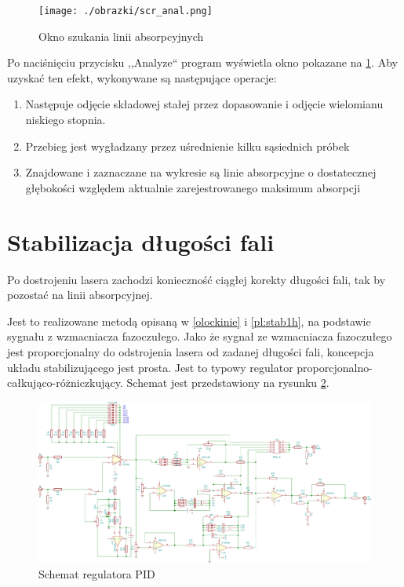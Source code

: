 \documentclass[a4paper,10pt,twoside]{report}
\begin{document}
\begin{figure}
\begin{center}
 \texttt{[image: ./obrazki/scr\_anal.png]}
\end{center}
\caption{Okno szukania linii absorpcyjnych}
\label{scr-anal}
\end{figure}

Po naciśnięciu przycisku ,,Analyze`` program wyświetla okno pokazane na \ref{scr-anal}.
Aby uzyskać ten efekt, wykonywane są następujące operacje:
\begin{enumerate}
 \item Następuje odjęcie składowej stałej przez dopasowanie i odjęcie wielomianu niskiego stopnia.
 \item Przebieg jest wygładzany przez uśrednienie kilku sąsiednich próbek
 \item Znajdowane i zaznaczane na wykresie są linie absorpcyjne o dostatecznej głębokości względem aktualnie zarejestrowanego maksimum absorpcji
\end{enumerate}





\section{Stabilizacja długości fali}

Po dostrojeniu lasera zachodzi konieczność ciągłej korekty długości fali, tak by pozostać na linii absorpcyjnej.

Jest to realizowane metodą opisaną w \ref{olockinie} i \ref{pl:stab1h}, na podstawie sygnału z wzmacniacza fazoczułego. %
Jako że sygnał ze wzmacniacza fazoczułego jest proporcjonalny do odstrojenia lasera od zadanej długości fali, koncepcja układu stabilizującego jest prosta.
Jest to typowy regulator proporcjonalno-całkująco-różniczkujący. Schemat jest przedstawiony na rysunku \ref{sch-pid}.

\begin{figure}
\begin{center}
 \includegraphics[scale=0.58, angle =90 ]{./obrazki/pidella.pdf}
\end{center}
\caption{Schemat regulatora PID}
\label{sch-pid}
\end{figure}
\end{document}
